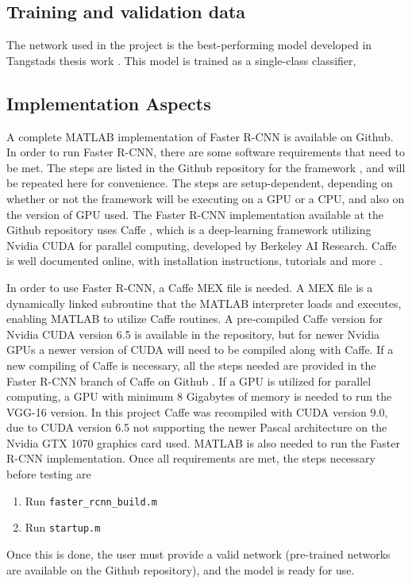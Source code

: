 \subsection{Training and validation data}
The network used in the project is the best-performing model developed in Tangstads thesis work \cite{tangstad}. This model is trained as a single-class classifier, 
\subsection{Implementation Aspects}
A complete MATLAB implementation of Faster R-CNN is available on Github. In order to run Faster R-CNN, there are some software requirements that need to be met. The steps are listed in the Github repository for the framework \cite{faster_rcnn_git}, and will be repeated here for convenience. The steps are setup-dependent, depending on whether or not the framework will be executing on a GPU or a CPU, and also on the version of GPU used. The Faster R-CNN implementation available at the Github repository uses Caffe \cite{jia2014caffe}, which is a deep-learning framework utilizing Nvidia CUDA for parallel computing, developed by Berkeley AI Research. Caffe is well documented online, with installation instructions, tutorials and more \cite{caffe}. 

In order to use Faster R-CNN, a Caffe MEX file is needed. A MEX file is a dynamically linked subroutine that the MATLAB interpreter loads and executes, enabling MATLAB to utilize Caffe routines. A pre-compiled Caffe version for Nvidia CUDA version 6.5 is available in the repository, but for newer Nvidia GPUs a newer version of CUDA will need to be compiled along with Caffe. If a new compiling of Caffe is necessary, all the steps needed are provided in the Faster R-CNN branch of Caffe on Github \cite{caffe_for_faster_rcnn}. If a GPU is utilized for parallel computing, a GPU with minimum 8 Gigabytes of memory is needed to run the VGG-16 version. In this project Caffe was recompiled with CUDA version 9.0, due to CUDA version 6.5 not supporting the newer Pascal architecture on the Nvidia GTX 1070 graphics card used. MATLAB is also needed to run the Faster R-CNN implementation. Once all requirements are met, the steps necessary before testing are
\begin{enumerate}
	\item Run \lstinline[basicstyle=\ttfamily]{faster_rcnn_build.m}
	\item Run \lstinline[basicstyle=\ttfamily]{startup.m}
\end{enumerate}
Once this is done, the user must provide a valid network (pre-trained networks are available on the Github repository), and the model is ready for use.
